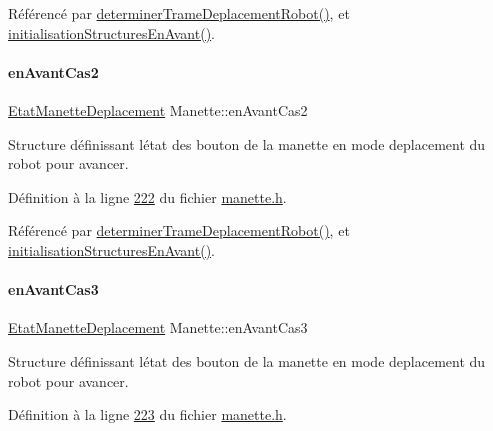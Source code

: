 Référencé par \hyperlink{manette_8cpp_source_l00341}{determiner\+Trame\+Deplacement\+Robot()}, et \hyperlink{manette_8cpp_source_l00103}{initialisation\+Structures\+En\+Avant()}.

\mbox{\label{class_manette_a37e31078db889bbf8202b7d8cb9c5947}} 
\paragraph{\texorpdfstring{en\+Avant\+Cas2}{enAvantCas2}}
{\footnotesize\ttfamily \hyperlink{struct_etat_manette_deplacement}{Etat\+Manette\+Deplacement} Manette\+::en\+Avant\+Cas2\hspace{0.3cm}{\ttfamily [private]}}



Structure définissant l\textquotesingle{}état des bouton de la manette en mode deplacement du robot pour avancer. 



Définition à la ligne \hyperlink{manette_8h_source_l00222}{222} du fichier \hyperlink{manette_8h_source}{manette.\+h}.



Référencé par \hyperlink{manette_8cpp_source_l00341}{determiner\+Trame\+Deplacement\+Robot()}, et \hyperlink{manette_8cpp_source_l00103}{initialisation\+Structures\+En\+Avant()}.

\mbox{\label{class_manette_a4546e6f56bac4a9e99a92539a68f3c5c}} 
\paragraph{\texorpdfstring{en\+Avant\+Cas3}{enAvantCas3}}
{\footnotesize\ttfamily \hyperlink{struct_etat_manette_deplacement}{Etat\+Manette\+Deplacement} Manette\+::en\+Avant\+Cas3\hspace{0.3cm}{\ttfamily [private]}}



Structure définissant l\textquotesingle{}état des bouton de la manette en mode deplacement du robot pour avancer. 



Définition à la ligne \hyperlink{manette_8h_source_l00223}{223} du fichier \hyperlink{manette_8h_source}{manette.\+h}.



